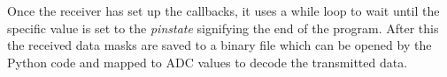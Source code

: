 \documentclass[../main.tex]{subfiles}
\begin{document}
Once the receiver has set up the callbacks, it uses a while loop to wait until the specific value is set to the \textit{pin\textunderscore state} signifying the end of the program.
After this the received data masks are saved to a binary file which can be opened by the Python code and mapped to ADC values to decode the transmitted data.
\end{document}
